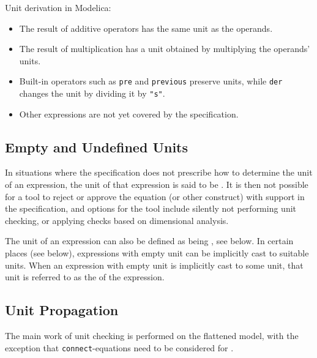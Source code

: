 Unit derivation in Modelica:
\begin{itemize}
\item
  The result of additive operators has the same unit as the operands.
\item
  The result of multiplication has a unit obtained by multiplying the operands' units.
\item
  Built-in operators such as \lstinline!pre! and \lstinline!previous! preserve units, while \lstinline!der! changes the unit by dividing it by \lstinline!"s"!.
\item
  Other expressions are not yet covered by the specification.
\end{itemize}


\subsection{Empty and Undefined Units}\label{empty-and-undefined-units}

In situations where the specification does not prescribe how to determine the unit of an expression, the unit of that expression is said to be .
It is then not possible for a tool to reject or approve the equation (or other construct) with support in the specification, and options for the tool include silently not performing unit checking, or applying checks based on dimensional analysis.

The unit of an expression can also be defined as being , see below.
In certain places (see below), expressions with empty unit can be implicitly cast to suitable units.
When an expression with empty unit is implicitly cast to some unit, that unit is referred to as the  of the expression.


\subsection{Unit Propagation}\label{unit-propagation}

The main work of unit checking is performed on the flattened model, with the exception that \lstinline!connect!-equations need to be considered for .

